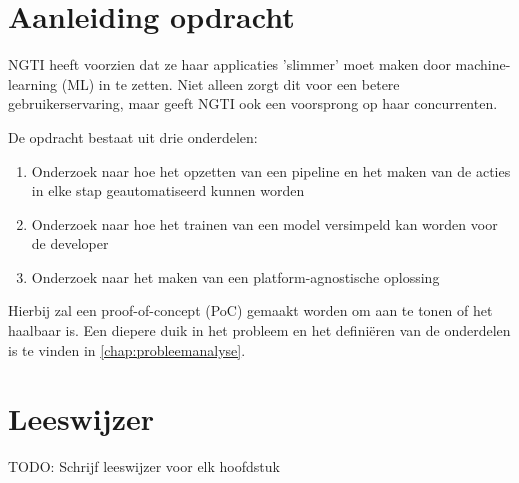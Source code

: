 \section{Aanleiding opdracht}\label{sec:aanleiding-opdracht}
NGTI heeft voorzien dat ze haar applicaties 'slimmer' moet maken door \gls{machine-learning} (ML) in te zetten. Niet alleen zorgt dit voor een betere gebruikerservaring, maar geeft NGTI ook een voorsprong op haar concurrenten.

De opdracht bestaat uit drie onderdelen:
\begin{enumerate}
  \item Onderzoek naar hoe het opzetten van een pipeline en het maken van de acties in elke stap geautomatiseerd kunnen worden
  \item Onderzoek naar hoe het trainen van een model versimpeld kan worden voor de developer
  \item Onderzoek naar het maken van een platform-agnostische oplossing
\end{enumerate}

Hierbij zal een proof-of-concept (PoC) gemaakt worden om aan te tonen of het haalbaar is. Een diepere duik in het probleem en het definiëren van de onderdelen is te vinden in \autoref{chap:probleemanalyse}.

\section{Leeswijzer}\label{sec:leeswijzer}
TODO: Schrijf leeswijzer voor elk hoofdstuk